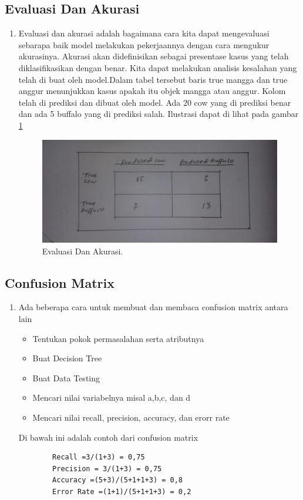 \subsection{Evaluasi Dan Akurasi}
\begin{enumerate}
\item Evaluasi dan akurasi adalah bagaimana cara kita dapat mengevaluasi sebarapa baik model melakukan pekerjaannya dengan cara mengukur akurasinya. Akurasi akan didefinisikan sebagai presentase kasus yang telah diklasifikasikan dengan benar. Kita dapat melakukan analisis kesalahan yang telah di buat oleh model.Dalam tabel tersebut baris true mangga dan true anggur menunjukkan kasus apakah itu objek mangga atau anggur. Kolom telah di prediksi dan dibuat oleh model. Ada 20 cow yang di prediksi benar dan ada 5 buffalo yang di prediksi salah. Ilustrasi dapat di lihat pada gambar \ref{4}

		\begin{figure}[!hbtp]
		\centerline{\includegraphics[width=1\textwidth]{figures/AIP/4.JPEG}}
		\caption{Evaluasi Dan Akurasi.}
		\label{4}
		\end{figure}
\end{enumerate}

\subsection{Confusion Matrix}
\begin{enumerate}
\item Ada beberapa cara untuk membuat dan membaca confusion matrix antara lain
	\begin{itemize}
		\item Tentukan pokok permasalahan serta atributnya
		\item Buat Decision Tree
		\item Buat Data Testing
		\item Mencari nilai variabelnya misal a,b,c, dan d
		\item Mencari nilai recall, precision, accuracy, dan erorr rate
	\end{itemize}
\subitem Di bawah ini adalah contoh dari confusion matrix
	\begin{verbatim}
		Recall =3/(1+3) = 0,75
		Precision = 3/(1+3) = 0,75
		Accuracy =(5+3)/(5+1+1+3) = 0,8
		Error Rate =(1+1)/(5+1+1+3) = 0,2 
	\end{verbatim}
\end{enumerate}

